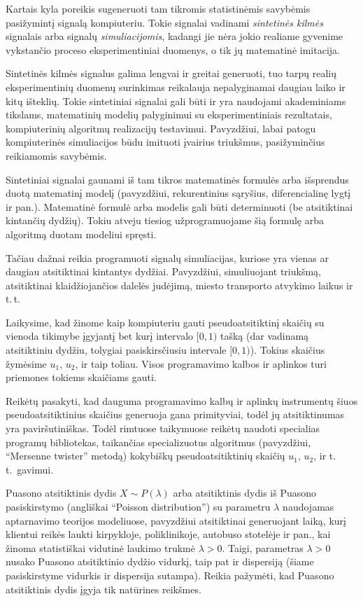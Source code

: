 \documentclass[a4paper,12pt]{article}
\begin{document}
Kartais kyla poreikis sugeneruoti tam tikromis statistinėmis savybėmis pasižymintį signalą kompiuteriu. Tokie signalai vadinami \emph{sintetinės kilmės} signalais
arba signalų \emph{simuliacijomis}, kadangi jie nėra jokio realiame gyvenime vykstančio proceso eksperimentiniai duomenys, o tik jų matematinė imitacija.

Sintetinės kilmės signalus galima lengvai ir greitai generuoti, tuo tarpų realių eksperimentinių duomenų surinkimas reikalauja nepalyginamai daugiau laiko ir kitų
išteklių. Tokie sintetiniai signalai gali būti ir yra naudojami akademiniams tikslams, matematinių modelių palyginimui su eksperimentiniais rezultatais,
kompiuterinių algoritmų realizacijų testavimui.
Pavyzdžiui, labai patogu kompiuterinės simuliacijos būdu imituoti įvairius triukšmus, pasižyminčius reikiamomis savybėmis.

Sintetiniai signalai gaunami iš tam tikros matematinės formulės arba išsprendus duotą matematinį modelį (pavyzdžiui, rekurentinius sąryšius, diferencialinę lygtį ir pan.).
Matematinė formulė arba modelis gali būti determinuoti (be atsitiktinai kintančių dydžių). Tokiu atveju tiesiog užprogramuojame šią formulę arba algoritmą duotam
modeliui spręsti.

Tačiau dažnai reikia programuoti signalų simuliacijas, kuriose yra vienas ar daugiau atsitiktinai kintantys dydžiai. Pavyzdžiui, simuliuojant triukšmą,
atsitiktinai klaidžiojančios dalelės judėjimą, miesto transporto atvykimo laikus ir t.\,t.\

Laikysime, kad žinome kaip kompiuteriu gauti pseudoatsitiktinį skaičių su vienoda tikimybe įgyjantį bet kurį intervalo $[0,1)$ tašką (dar vadinamą atsitiktiniu dydžiu,
tolygiai pasiskirsčiusiu intervale $[0,1)$). Tokius skaičius žymėsime $u_1$, $u_2$, ir taip toliau.
Visos programavimo kalbos ir aplinkos turi priemones tokiems skaičiams gauti.

Reikėtų pasakyti, kad dauguma programavimo kalbų ir aplinkų instrumentų šiuos pseudoatsitiktinius skaičius generuoja gana primityviai, todėl jų atsitiktinumas
yra paviršutiniškas. Todėl rimtuose taikymuose reikėtų naudoti specialias programų bibliotekas, taikančias specializuotus algoritmus
(pavyzdžiui, ``Mersenne twister'' metodą) kokybiškų pseudoatsitiktinių skaičių $u_1$, $u_2$, ir t.\,t.\ gavimui.

Puasono atsitiktinis dydis $X \sim P(\lambda)$ arba atsitiktinis dydis iš Puasono pasiskirstymo (angliškai ``Poisson distribution'') su parametru $\lambda$
naudojamas aptarnavimo teorijos modeliuose, pavyzdžiui atsitiktinai generuojant laiką, kurį klientui reikės laukti kirpykloje, poliklinikoje, autobuso stotelėje ir pan.,
kai žinoma statistiškai vidutinė laukimo trukmė $\lambda>0$.
Taigi, parametras $\lambda>0$ nusako Puasono atsitiktinio dydžio vidurkį, taip pat ir dispersiją (šiame pasiskirstyme vidurkis ir dispersija sutampa).
Reikia pažymėti, kad Puasono atsitiktinis dydis įgyja tik natūrines reikšmes.
\end{document}
